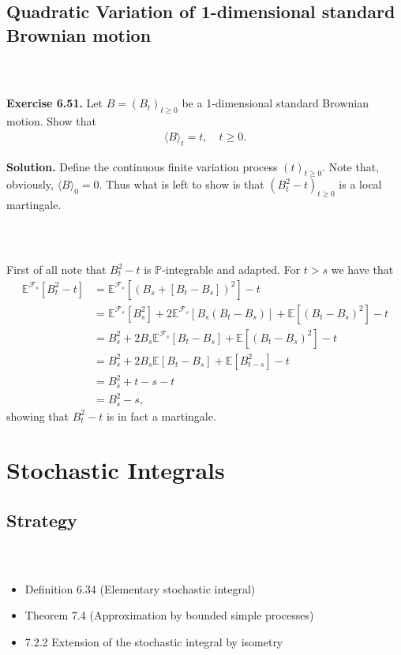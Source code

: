 \documentclass{beamer}
\numberwithin{equation}{section}
\newenvironment{frame2}{\begin{frame}\frametitle{{\normalsize \secname} \\ {\large \subsecname}}}{\end{frame}}
\begin{document}
\subsection{Quadratic Variation of 1-dimensional standard Brownian motion}

\begin{frame2}
    \textbf{Exercise 6.51.}
    Let $B=(B_t)_{t\geq 0}$ be a 1-dimensional standard Brownian motion.
    Show that
    \begin{align}
        \langle B \rangle_t = t, \quad t\geq 0.
    \end{align}
    
    \vspace{10pt}
    \textbf{Solution.}
    Define the continuous finite variation process $(t)_{t\geq 0}$. 
    Note that, obviously, $\langle B \rangle_0 = 0$.
    Thus what is left to show is that $(B_t^2-t)_{t\geq 0}$ is a local martingale.
\end{frame2}

\begin{frame2}
    First of all note that $B_t^2-t$ is $\mathbb{P}$-integrable and adapted.
    For $t > s$ we have that
    \begin{align*}
        \mathbb{E}^{\mathcal{F}_s}\left[B_t^2-t\right]&= \mathbb{E}^{\mathcal{F}_s}\left[(B_s+[B_t-B_s])^2\right]-t \\
        &= \mathbb{E}^{\mathcal{F}_s}\left[B_s^2\right] +2\mathbb{E}^{\mathcal{F}_s}[B_s(B_t-B_s)] + \mathbb{E}\left[(B_t-B_s)^2\right]-t \\
        &=B_s^2 + 2B_s \mathbb{E}^{\mathcal{F}_s}[B_t-B_s]+\mathbb{E}\left[(B_t-B_s)^2\right]-t \\
        &= B_s^2+2B_s\mathbb{E}[B_t-B_s]+\mathbb{E}\left[B_{t-s}^2\right]-t \\
        &=B_s^2 + t - s - t \\
        &= B_s^2 - s,
    \end{align*}
    showing that $B_t^2-t$ is in fact a martingale.
\end{frame2}

\section{Stochastic Integrals}

\subsection{Strategy}
\begin{frame2}
    \begin{itemize}
        \item Definition 6.34 (Elementary stochastic integral)
        \item Theorem 7.4 (Approximation by bounded simple processes)
        \item 7.2.2 Extension of the stochastic integral by isometry
    \end{itemize}
\end{frame2}
\end{document}
